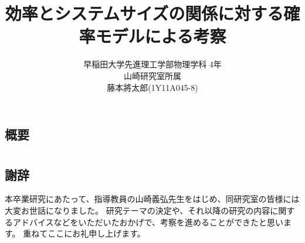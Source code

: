 \documentclass[a4j,11pt,onecolumn,oneside,openany]{jsbook}
\title{効率とシステムサイズの関係に対する確率モデルによる考察}
\author{早稲田大学先進理工学部物理学科 4年\\
山崎研究室所属\\
藤本將太郎(1Y11A045-8)}
\begin{document}
\maketitle
\thispagestyle{empty}
\newpage
\section*{概要}

\newpage
{}
\tableofcontents
\newpage
{}





\newpage
\chapter*{}
\section*{謝辞}
本卒業研究にあたって、指導教員の山崎義弘先生をはじめ、同研究室の皆様には大変お世話になりました。
研究テーマの決定や、それ以降の研究の内容に関するアドバイスなどをいただいたおかげで、考察を進めることができたと思います。
重ねてここにお礼申し上げます。
\end{document}
